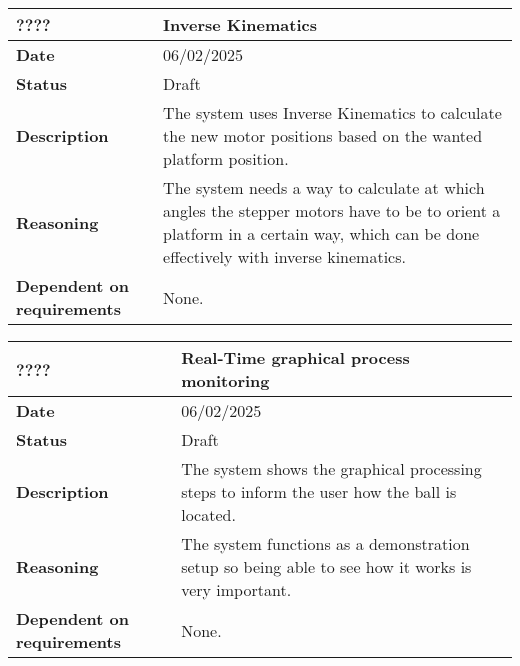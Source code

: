 \documentclass{article}
\begin{document}


\begin{table}[H]
    \renewcommand{\arraystretch}{1.3}
    \begin{tabular}{|l|p{10cm}|}
        \hline
        \rowcolor{gray!50}
        \textbf{????} & \textbf{Inverse Kinematics} \\ \hline
        \textbf{Date} & 06/02/2025 \\ \hline
        \textbf{Status} & Draft \\ \hline
        \textbf{Description} & The system uses Inverse Kinematics to calculate the new motor positions based on the wanted platform position. \\ \hline
        \textbf{Reasoning} & The system needs a way to calculate at which angles the stepper motors have to be to orient a platform in a certain way, which can be done effectively with inverse kinematics. \\ \hline
        \textbf{Dependent on requirements} & None. \\ \hline
    \end{tabular}
\end{table}

\begin{table}[H]
    \renewcommand{\arraystretch}{1.3}
    \begin{tabular}{|l|p{10cm}|}
        \hline
        \rowcolor{gray!50}
        \textbf{????} & \textbf{Real-Time graphical process monitoring} \\ \hline
        \textbf{Date} & 06/02/2025 \\ \hline
        \textbf{Status} & Draft \\ \hline
        \textbf{Description} & The system shows the graphical processing steps to inform the user how the ball is located. \\ \hline
        \textbf{Reasoning} & The system functions as a demonstration setup so being able to see how it works is very important. \\ \hline
        \textbf{Dependent on requirements} & None. \\ \hline
    \end{tabular}
\end{table}
\end{document}
